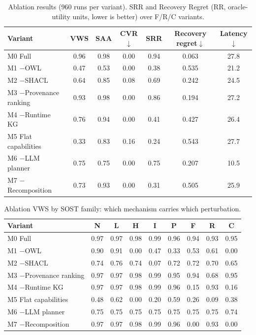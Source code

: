 \begin{table}[H]
\centering
\caption{Ablation results (960 runs per variant). SRR and Recovery Regret (RR, oracle-utility units, lower is better) over F/R/C variants.}
\label{tab:ablationresults}
\small
\begin{tabular}{lcccccc}
\toprule
Variant & VWS & SAA & CVR$\downarrow$ & SRR & Recovery regret$\downarrow$ & Latency$\downarrow$\\
\midrule
M0 Full & 0.96 & 0.98 & 0.00 & 0.94 & 0.063 & 27.8\\
M1 $-$OWL & 0.47 & 0.53 & 0.00 & 0.38 & 0.535 & 21.2\\
M2 $-$SHACL & 0.64 & 0.85 & 0.08 & 0.69 & 0.242 & 24.5\\
M3 $-$Provenance ranking & 0.93 & 0.98 & 0.00 & 0.86 & 0.194 & 27.2\\
M4 $-$Runtime KG & 0.76 & 0.94 & 0.00 & 0.41 & 0.427 & 26.4\\
M5 Flat capabilities & 0.33 & 0.83 & 0.16 & 0.24 & 0.543 & 27.7\\
M6 $-$LLM planner & 0.75 & 0.75 & 0.00 & 0.75 & 0.207 & 10.5\\
M7 $-$Recomposition & 0.73 & 0.93 & 0.00 & 0.31 & 0.505 & 25.9\\
\bottomrule
\end{tabular}
\end{table}

\begin{table}[H]
\centering
\caption{Ablation VWS by SOST family: which mechanism carries which perturbation.}
\label{tab:ablationsost}
\scriptsize
\begin{tabular}{lcccccccc}
\toprule
Variant & N & L & H & I & P & F & R & C\\
\midrule
M0 Full & 0.97 & 0.97 & 0.98 & 0.99 & 0.96 & 0.94 & 0.93 & 0.95\\
M1 $-$OWL & 0.90 & 0.91 & 0.00 & 0.47 & 0.33 & 0.53 & 0.61 & 0.00\\
M2 $-$SHACL & 0.74 & 0.76 & 0.74 & 0.07 & 0.72 & 0.72 & 0.70 & 0.65\\
M3 $-$Provenance ranking & 0.97 & 0.97 & 0.98 & 0.99 & 0.95 & 0.94 & 0.68 & 0.95\\
M4 $-$Runtime KG & 0.97 & 0.97 & 0.98 & 0.99 & 0.96 & 0.15 & 0.93 & 0.16\\
M5 Flat capabilities & 0.48 & 0.62 & 0.00 & 0.20 & 0.59 & 0.26 & 0.09 & 0.38\\
M6 $-$LLM planner & 0.75 & 0.75 & 0.75 & 0.75 & 0.75 & 0.75 & 0.75 & 0.74\\
M7 $-$Recomposition & 0.97 & 0.97 & 0.98 & 0.99 & 0.96 & 0.00 & 0.93 & 0.00\\
\bottomrule
\end{tabular}
\end{table}
